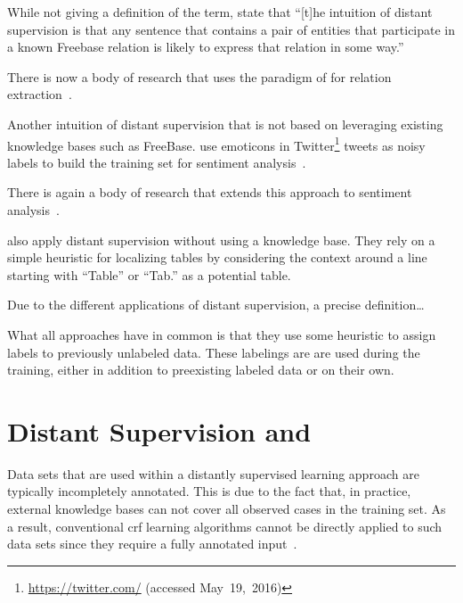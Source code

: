 While not giving a definition of the term, \citet{mintz2009distant} state that ``[t]he intuition of distant supervision is that any sentence that contains a pair of entities that participate in a known Freebase relation is likely to express that relation in some way.''

There is now a body of research that uses the paradigm of \citet{mintz2009distant} for relation extraction~\citep{benson2011event,ritter2011named,nguyen2011end,takamatsu2012reducing,xu2013filling}.

\bigskip

Another intuition of \gls{distant supervision} that is not based on leveraging existing knowledge bases such as FreeBase.
\citet{go2009twitter} use emoticons in Twitter\footnote{\url{https://twitter.com/} (accessed May~19,~2016)} tweets as noisy labels to build the training set for sentiment analysis~\citep{go2009twitter}.

There is again a body of research that extends this approach to sentiment analysis~\citep{purver2012experimenting,marchetti2012learning,suttles2013distant}.

\citet{fan2015detecting} also apply distant supervision without using a knowledge base.
They rely on a simple heuristic for localizing tables by considering the context around a line starting with ``Table'' or ``Tab.'' as a potential table.

\bigskip

Due to the different applications of \gls{distant supervision}, a precise definition\dots

What all approaches have in common is that they use some heuristic to assign labels to previously unlabeled data. These labelings are are used during the training, either in addition to preexisting labeled data or on their own.



\section{Distant Supervision and }

Data sets that are used within a distantly supervised learning approach are typically incompletely annotated.
This is due to the fact that, in practice, external knowledge bases can not cover all observed cases in the training set.
As a result, conventional \gls{crf} learning algorithms cannot be directly applied to such data sets since they require a fully annotated input~\citep{tsuboi2008training}.

